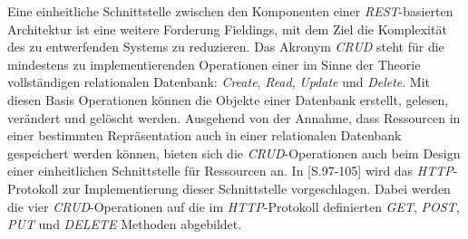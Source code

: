 Eine einheitliche Schnittstelle zwischen den Komponenten einer
\textit{REST}-basierten Architektur ist eine weitere Forderung
Fieldings, mit dem Ziel die Komplexität des zu entwerfenden Systems zu
reduzieren. Das Akronym \textit{CRUD}  steht für die mindestens zu implementierenden
Operationen einer im Sinne der Theorie vollständigen relationalen
Datenbank: \textit{Create}, \textit{Read}, \textit{Update} und
\textit{Delete}. Mit diesen Basis Operationen können die Objekte einer
Datenbank erstellt, gelesen, verändert und gelöscht werden. Ausgehend
von der Annahme, dass Ressourcen in einer bestimmten Repräsentation
auch in einer relationalen Datenbank gespeichert werden können, bieten
sich die \textit{CRUD}-Operationen auch beim Design einer
einheitlichen Schnittstelle für Ressourcen an. In
\cite{Richardson07}[S.97-105] wird das \textit{HTTP}-Protokoll zur
Implementierung dieser Schnittstelle vorgeschlagen. Dabei werden die
vier \textit{CRUD}-Operationen auf die im \textit{HTTP}-Protokoll
definierten \textit{GET}, \textit{POST}, \textit{PUT} und
\textit{DELETE} Methoden abgebildet.

